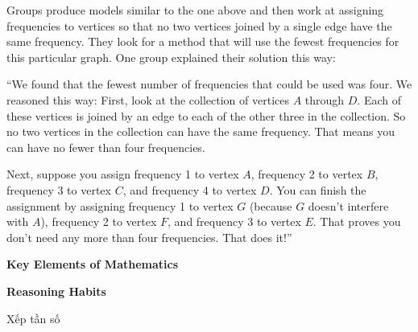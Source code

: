 {    Groups produce models similar to the one above and then work at assigning frequencies to vertices so that no two vertices joined by a single edge have the same frequency. They look for a method that will use the fewest frequencies for this particular graph. One group explained their solution this way:

    ``We found that the fewest number of frequencies that could be used was four. We reasoned this way: First, look at the collection of vertices $A$ through $D$. Each of these vertices is joined by an edge to each of the other three in the collection. So no two vertices in the collection can have the same frequency. That means you can have no fewer than four frequencies.

    Next, suppose you assign frequency 1 to vertex $A$, frequency 2 to vertex $B$, frequency 3 to vertex $C$, and frequency 4 to vertex $D$. You can finish the assignment by assigning frequency 1 to vertex $G$ (because $G$ doesn't interfere with $A$), frequency 2 to vertex $F$, and frequency 3 to vertex $E$. That proves you don't need any more than four frequencies. That does it!''

    \textbf{Key Elements of Mathematics}

    \begin{hanglist}
    \end{hanglist}

    \textbf{Reasoning Habits}

    \begin{hanglist}


    \end{hanglist}
  }
  {
    Xếp tần số
  }

